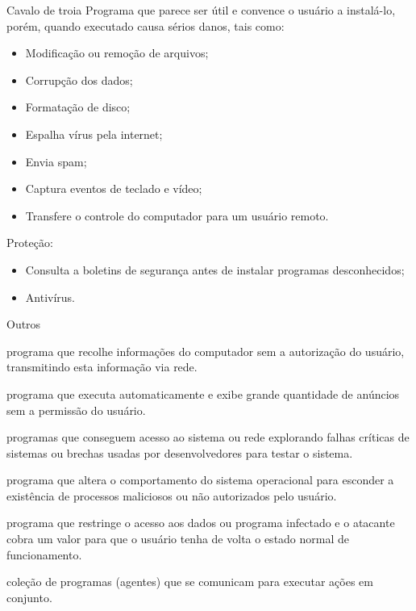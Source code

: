 \begin{frame}{Cavalo de troia}\small
  Programa que parece ser útil e convence o usuário a instalá-lo,
  porém, quando executado causa sérios danos, tais como:
  
  \begin{itemize}
    \item Modificação ou remoção de arquivos;
    \item Corrupção dos dados;
    \item Formatação de disco;
    \item Espalha vírus pela internet;
    \item Envia spam;
    \item Captura eventos de teclado e vídeo;
    \item Transfere o controle do computador para um usuário remoto.
    \end{itemize}

    \pause\bigskip
    \alert{Proteção:}
    \begin{itemize}
    \item Consulta a boletins de segurança antes de instalar programas desconhecidos;
    \item Antivírus.
    \end{itemize}
  \end{frame}

\begin{frame}{Outros \insertlecture}\small
  \begin{description}[<+->]
  \item[{\em Spyware}:] programa que recolhe informações do computador 
    sem a autorização do usuário, transmitindo esta informação via rede.
  \item[{\em Adware}:] programa que executa automaticamente e exibe 
    grande quantidade de anúncios sem a permissão do usuário.
  \item[{\em Backdoor}:] programas que conseguem acesso ao sistema ou rede 
    explorando falhas críticas de sistemas ou brechas usadas por desenvolvedores 
    para testar o sistema.
  \item[{\em Rootkit}:] programa que altera o comportamento do sistema operacional 
    para esconder a existência de processos maliciosos ou não autorizados pelo 
    usuário.
  \item[{\em Ransomware}:] programa que restringe o acesso aos dados ou programa 
    infectado e o atacante cobra um valor para que o usuário tenha de volta 
    o estado normal de funcionamento.
  \item[{\em Botnet}:] coleção de programas (agentes) que se comunicam para 
    executar ações em conjunto. 
  \end{description}  
\end{frame}
